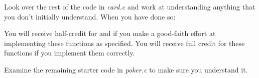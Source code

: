 Look over the rest of the code in \textit{card.c} and work at understanding anything that you don't initially understand.
When you have done so:
\begin{description}
\end{description}

You will receive half-credit for  and  if you make a good-faith effort at implementing these functions as specified.
You will receive full credit for these functions if you implement them correctly.

\begin{description}
\end{description}

Examine the remaining starter code in \textit{poker.c} to make sure you understand it.
